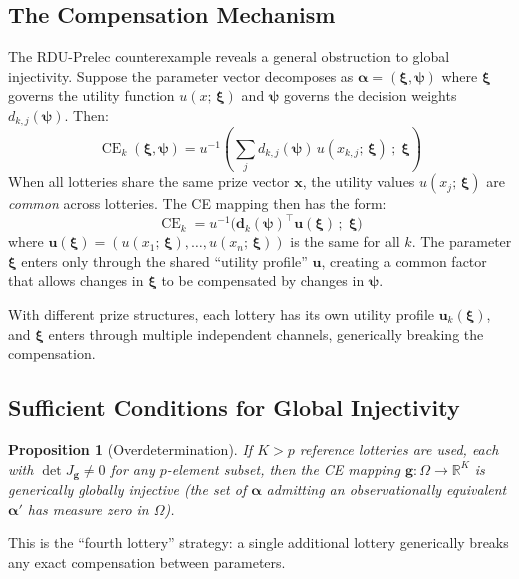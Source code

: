 \documentclass[11pt,a4paper]{article}
\newtheorem{proposition}[theorem]{Proposition}
\theoremstyle{definition}
\DeclareMathOperator{\CE}{CE}
\begin{document}
\subsection{The Compensation Mechanism}

The RDU-Prelec counterexample reveals a general obstruction to global
injectivity. Suppose the parameter vector decomposes as
$\bm{\alpha} = (\bm{\xi}, \bm{\psi})$ where $\bm{\xi}$ governs the utility
function $u(x;\, \bm{\xi})$ and $\bm{\psi}$ governs the decision weights
$d_{k,j}(\bm{\psi})$. Then:
\begin{equation}
    \CE_k(\bm{\xi}, \bm{\psi}) = u^{-1}\!\left(
    \sum_{j} d_{k,j}(\bm{\psi}) \, u(x_{k,j};\, \bm{\xi}) \,;\; \bm{\xi}\right)
\end{equation}
When all lotteries share the same prize vector $\mathbf{x}$, the utility
values $u(x_j;\, \bm{\xi})$ are \emph{common} across lotteries. The CE
mapping then has the form:
\begin{equation}
    \CE_k = u^{-1}\!\big(\mathbf{d}_k(\bm{\psi})^\top
    \mathbf{u}(\bm{\xi}) \,;\; \bm{\xi}\big)
\end{equation}
where $\mathbf{u}(\bm{\xi}) = (u(x_1;\,\bm{\xi}), \ldots, u(x_n;\,\bm{\xi}))$
is the same for all $k$. The parameter $\bm{\xi}$ enters only through the
shared ``utility profile'' $\mathbf{u}$, creating a common factor that
allows changes in $\bm{\xi}$ to be compensated by changes in $\bm{\psi}$.

With different prize structures, each lottery has its own utility profile
$\mathbf{u}_k(\bm{\xi})$, and $\bm{\xi}$ enters through multiple independent
channels, generically breaking the compensation.

\subsection{Sufficient Conditions for Global Injectivity}
\label{sec:sufficient}

\begin{proposition}[Overdetermination]
\label{prop:overdetermined}
If $K > p$ reference lotteries are used, each with
$\det J_{\mathbf{g}} \neq 0$ for any $p$-element subset, then the CE mapping
$\mathbf{g}: \Omega \to \mathbb{R}^K$ is generically globally injective
(the set of $\bm{\alpha}$ admitting an observationally equivalent
$\bm{\alpha}'$ has measure zero in $\Omega$).
\end{proposition}

This is the ``fourth lottery'' strategy: a single additional lottery
generically breaks any exact compensation between parameters.
\end{document}
